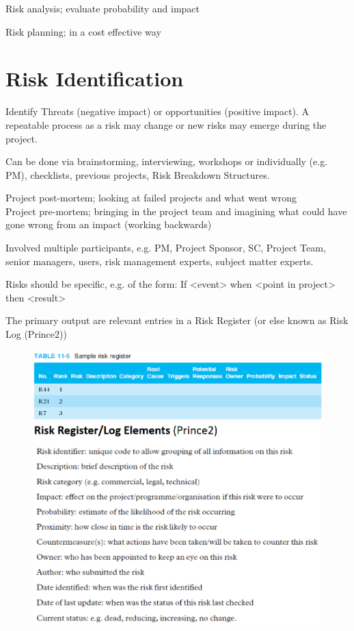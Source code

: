 \documentclass[]{project_plan}
\begin{document}
\newpage

Risk analysis; evaluate probability and impact

Risk planning; in a cost effective way

\section{Risk Identification}

Identify Threats (negative impact) or opportunities (positive impact). A repeatable process as
a risk may change or new risks may emerge during the project.

Can be done via brainstorming, interviewing, workshops or individually (e.g. PM), checklists,
previous projects, Risk Breakdown Structures.

Project post-mortem; looking at failed projects and what went wrong\\
Project pre-mortem; bringing in the project team and imagining what could have gone wrong from an impact (working backwards)

Involved multiple participants, e.g. PM, Project Sponsor, SC, Project Team, senior managers,
users, risk management experts, subject matter experts.

Risks should be specific, e.g. of the form: If <event> when <point in project> then <result>

The primary output are relevant entries in a Risk Register (or else known as Risk Log
(Prince2))

\begin{figure}[h!]
  \centering
  \includegraphics[width=\linewidth]{risk_register.png}
  \includegraphics[width=30em]{risk_register_prince2.png}
\end{figure}
\end{document}
